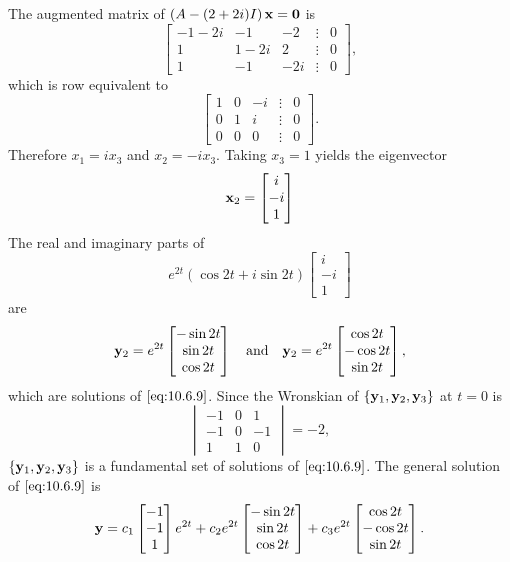 \documentclass{ximera}
\begin{document}
\begin{example}
\begin{explanation}
The augmented  matrix of $\left(A-(2+2i)I\right){\bf x=0}$ is
$$
\begin{bmatrix}-1-2i&-1&-2&\vdots&0\\ 1&
1-2i&2&\vdots&0\\ 1&-1&-2i&\vdots&0
\end{bmatrix},
$$
which is row equivalent to
$$
\begin{bmatrix}1&0&-i&\vdots&0\\ 0&1&i&
\vdots&0\\ 0&0&0&\vdots&0\end{bmatrix}.
$$
Therefore $x_1=ix_3$ and $x_2=-ix_3$. Taking $x_3=1$ yields
the eigenvector
$$
{\bf x}_2=\begin{bmatrix} i\\-i\\1\end{bmatrix}
$$
The real and imaginary parts of
$$
e^{2t}(\cos2t+i\sin2t)\begin{bmatrix} i\\-i\\1\end{bmatrix}
$$
are
$$
{\bf y}_2=e^{2t}\begin{bmatrix}-\sin2t\\\sin2t\\\cos
2t\end{bmatrix}\quad\mbox{and}\quad
{\bf y}_2=e^{2t}\begin{bmatrix}\cos2t\\-\cos2t\\\sin
2t\end{bmatrix},
$$
which are solutions of  $\eqref{eq:10.6.9}$.
Since  the Wronskian of $\{{\bf y}_1,{\bf y}_2,{\bf y}_3\}$
at $t=0$ is
$$
\begin{vmatrix}
-1&0&1\\-1&0&-1\\1&1&0\end{vmatrix}=-2,
$$
$\{{\bf y}_1,{\bf y}_2,{\bf y}_3\}$ is a fundamental set of solutions
of $\eqref{eq:10.6.9}$.  The general solution of $\eqref{eq:10.6.9}$ is
$$
{\bf y}=c_1\begin{bmatrix}-1\\-1\\1\end{bmatrix}e^{2t}+
c_2e^{2t}\begin{bmatrix}-\sin2t\\\sin2t\\\cos
2t\end{bmatrix}+
c_3e^{2t}\begin{bmatrix}\cos2t\\-\cos2t\\\sin
2t\end{bmatrix}.
$$
\end{explanation}
\end{example}
\end{document}
